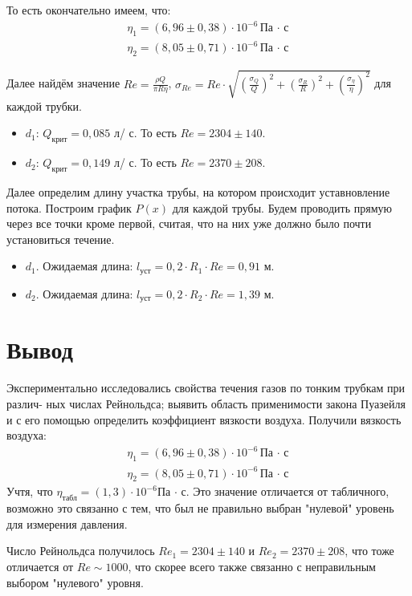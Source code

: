 То есть окончательно имеем, что: 
\begin{align*}
  \eta_1 = (6,96 \pm 0,38) \cdot 10^{-6} \text{Па $\cdot $ с} \\
  \eta_2 = (8,05 \pm 0,71) \cdot 10^{-6} \text{Па $\cdot $ с}
\end{align*}

Далее найдём значение $Re = \frac{\rho Q}{\pi R \eta}$, $\sigma_{Re} = Re \cdot \sqrt{{\left( \frac{\sigma_Q}{Q} \right)} ^ 2 + {\left( \frac{\sigma_R}{R} \right)} ^ 2 + {\left( \frac{\sigma_\eta}{\eta} \right)} ^ 2}$ для каждой трубки.

\begin{itemize}
  \item $d_1$: $Q_\text{крит} = 0,085$ л/ с. То есть $Re = 2304 \pm 140$. 
  \item $d_2$: $Q_\text{крит} = 0,149$ л/ с. То есть $Re = 2370 \pm 208$.
\end{itemize}


Далее определим длину участка трубы, на котором происходит уставновление потока. Построим график $P(x)$ для каждой трубы. Будем проводить прямую через все точки кроме первой, считая, что на них уже должно было почти установиться течение.

\newpage
\begin{itemize}
  \item $d_1$. Ожидаемая длина: $l_{\text{уст}} = 0,2 \cdot R_1 \cdot Re = 0,91$ м.
  \item $d_2$. Ожидаемая длина: $l_{\text{уст}} = 0,2 \cdot R_2 \cdot Re = 1,39$ м.
\end{itemize}

\section*{Вывод}

Экспериментально исследовались свойства течения газов по тонким трубкам при различ-
ных числах Рейнольдса; выявить область применимости закона Пуазейля и с его помощью
определить коэффициент вязкости воздуха. Получили вязкость воздуха:
\begin{align*}
  \eta_1 = (6,96 \pm 0,38) \cdot 10^{-6} \text{Па $\cdot $ с} \\
  \eta_2 = (8,05 \pm 0,71) \cdot 10^{-6} \text{Па $\cdot $ с}
\end{align*}
Учтя, что $\eta_\text{табл} = (1,3) \cdot 10^{-6} $Па $\cdot $ с. Это значение отличается от табличного, возможно это связанно с тем, что был не правильно выбран "нулевой" уровень для измерения давления.

Число Рейнольдса получилось $Re_1 = 2304 \pm 140$ и $Re_2 = 2370 \pm 208$, что тоже отличается от $Re \sim 1000$, что скорее всего также связанно с неправильным выбором "нулевого" уровня.







